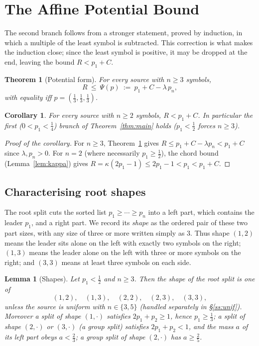 \documentclass[journal]{IEEEtran}
\newtheorem{theorem}{Theorem}
\newtheorem{lemma}{Lemma}
\newtheorem{corollary}{Corollary}
\theoremstyle{definition}
\newcommand{\kp}{\kappa}
\newcommand{\CC}{C}
\newcommand{\lam}{\lambda}
\begin{document}
\section{The Affine Potential Bound}\label{sec:affine}

The second branch follows from a stronger statement, proved by induction, in
which a multiple of the least symbol is subtracted. This correction is what makes
the induction close; since the least symbol is positive, it may be dropped at the
end, leaving the bound $R<p_1+\CC$.

\begin{theorem}[Potential form]\label{thm:aff}
For every source with $n\ge3$ symbols,
\[
  R\ \le\ \Psi(p)\ :=\ p_1+\CC-\lam\,p_n ,
\]
with equality iff $p=(\tfrac13,\tfrac13,\tfrac13)$.
\end{theorem}

\begin{corollary}\label{cor:aff}
For every source with $n\ge2$ symbols, $R<p_1+\CC$. In particular the
first \textup{(}$0<p_1<\tfrac14$\textup{)} branch of Theorem~\ref{thm:main}
holds \textup{(}$p_1<\tfrac12$ forces $n\ge3$\textup{)}.
\end{corollary}

\begin{proof}[Proof of the corollary]
For $n\ge3$, Theorem~\ref{thm:aff} gives $R\le p_1+\CC-\lam p_n<p_1+\CC$
since $\lam,p_n>0$. For $n=2$ (where necessarily $p_1\ge\tfrac12$), the chord
bound (Lemma~\ref{lem:kappa}) gives $R=\kp(2p_1-1)\le2p_1-1<p_1<p_1+\CC$.
\end{proof}

\subsection{Characterising root shapes}

The root split cuts the sorted list $p_1\ge\cdots\ge p_n$ into a left part,
which contains the leader $p_1$, and a right part. We record its
\emph{shape} as the ordered pair of these two part sizes, with any size of
three or more written simply as $3$. Thus shape $(1,2)$ means the leader
sits alone on the left with exactly two symbols on the right; $(1,3)$ means
the leader alone on the left with three or more symbols on the right; and
$(3,3)$ means at least three symbols on each side.

\begin{lemma}[Shapes]\label{lem:shapes}
Let $p_1<\tfrac12$ and $n\ge3$. Then the shape of the root split is one of
\[
  (1,2),\quad(1,3),\quad(2,2),\quad(2,3),\quad(3,3),
\]
unless the source is uniform with $n\in\{3,5\}$ \textup{(}handled separately in
\S\ref{ss:unif}\textup{)}. Moreover a split of shape $(1,\cdot)$ satisfies
$2p_1+p_2\ge1$, hence $p_1\ge\tfrac13$; a split of shape $(2,\cdot)$ or
$(3,\cdot)$ \textup{(}a \emph{group} split\textup{)} satisfies $2p_1+p_2<1$,
and the mass $a$ of its left part obeys $a<\tfrac23$; a group split of shape $(2,\cdot)$ has
$a\ge\tfrac25$.
\end{lemma}
\end{document}
